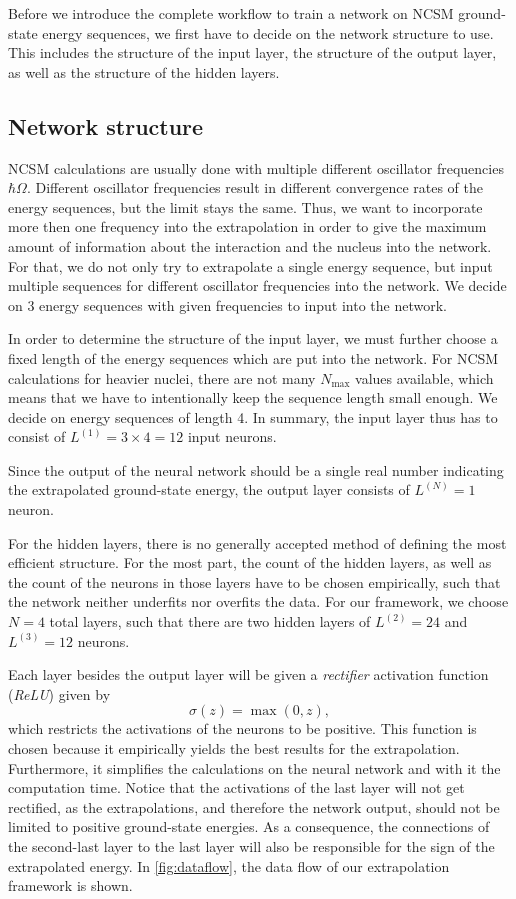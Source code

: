 Before we introduce the complete workflow to train a network on NCSM ground-state energy sequences, we first have to decide on the network structure to use.
This includes the structure of the input layer, the structure of the output layer, as well as the structure of the hidden layers.

\subsection{Network structure}
NCSM calculations are usually done with multiple different oscillator frequencies $\hbar \Omega$. Different oscillator frequencies result in different convergence rates of the energy sequences, but the limit stays the same. Thus, we want to incorporate more then one frequency into the extrapolation in order to give the maximum amount of information about the interaction and the nucleus into the network.
For that, we do not only try to extrapolate a single energy sequence, but input multiple sequences for different oscillator frequencies into the network.
We decide on 3 energy sequences with given frequencies to input into the network.

In order to determine the structure of the input layer, we must further choose a fixed length of the energy sequences which are put into the network.
For NCSM calculations for heavier nuclei, there are not many $N_\mathrm{max}$ values available, which means that we have to intentionally keep the sequence length small enough.
We decide on energy sequences of length 4.
In summary, the input layer thus has to consist of $L^{(1)} = 3\times 4 = 12$ input neurons.

Since the output of the neural network should be a single real number indicating the extrapolated ground-state energy, the output layer consists of $L^{(N)} = 1$ neuron.

For the hidden layers, there is no generally accepted method of defining the most efficient structure. For the most part, the count of the hidden layers, as well as the count of the neurons in those layers have to be chosen empirically, such that the network neither underfits nor overfits the data. For our framework, we choose $N = 4$ total layers, such that there are two hidden layers of $L^{(2)} = 24$ and $L^{(3)} = 12$ neurons.

Each layer besides the output layer will be given a \textit{rectifier} activation function (\textit{ReLU}) given by
\begin{equation}
  \sigma(z) = \max(0, z),
\end{equation}
which restricts the activations of the neurons to be positive. This function is chosen because it empirically yields the best results for the extrapolation. Furthermore, it simplifies the calculations on the neural network and with it the computation time. Notice that the activations of the last layer will not get rectified, as the extrapolations, and therefore the network output, should not be limited to positive ground-state energies. As a consequence, the connections of the second-last layer to the last layer will also be responsible for the sign of the extrapolated energy. In \autoref{fig:dataflow}, the data flow of our extrapolation framework is shown.


